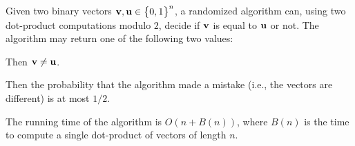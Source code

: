 \begin{lemma}
    Given two binary vectors $\mathbf{v}, \mathbf{u} \in \left\{ {\bigl. 0,1} \right\}^n$, a
    randomized algorithm can, using two dot-product computations
    modulo $2$, decide if $\mathbf{v}$ is equal to $\mathbf{u}$ or not.  The
    algorithm may return one of the following two values:
    \begin{compactenumA}
        \item[$\boldsymbol \ne$:] Then $\mathbf{v} \neq \mathbf{u}$.

        \item[$\boldsymbol =$:] Then the probability that the
        algorithm made a mistake (i.e., the vectors are different) is
        at most $1/2$.
    \end{compactenumA}
    The running time of the algorithm is $O( n + B(n))$, where $B(n)$
    is the time to compute a single dot-product of vectors of length
    $n$.
\end{lemma}
